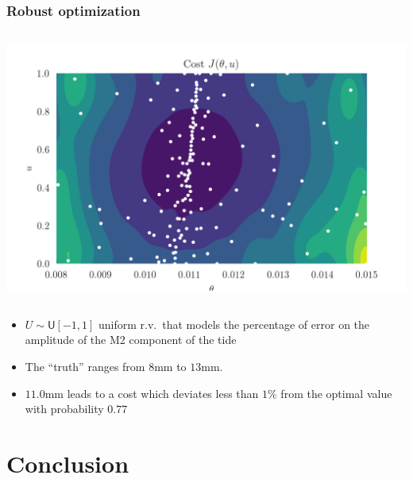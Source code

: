 \documentclass[10pt,aspectratio=169]{beamer}
\newcommand\manupath{/home/victor/acadwriting/Manuscrit/Text/}
\newcommand{\UU}{U}
\begin{document}
\begin{frame}
  \frametitle{Robust optimization}
  \begin{center}
    \begin{columns}
      \begin{column}{.5\textwidth}
        \includegraphics[width=\textwidth]{croco.png}
      \end{column}
    \end{columns}
  \end{center}

  \begin{itemize}
  \item $\UU\sim \mathsf{U}[-1, 1]$ uniform r.v.\ that models the
    percentage of error on the amplitude of the M2 component of the
    tide
  \item The ``truth'' ranges from $8$mm to $13$mm.
  \item $11.0$mm leads to a cost which deviates less than $1\%$ from
    the optimal value with probability $0.77$
  \end{itemize}
\end{frame}



\section{Conclusion}
\end{document}
